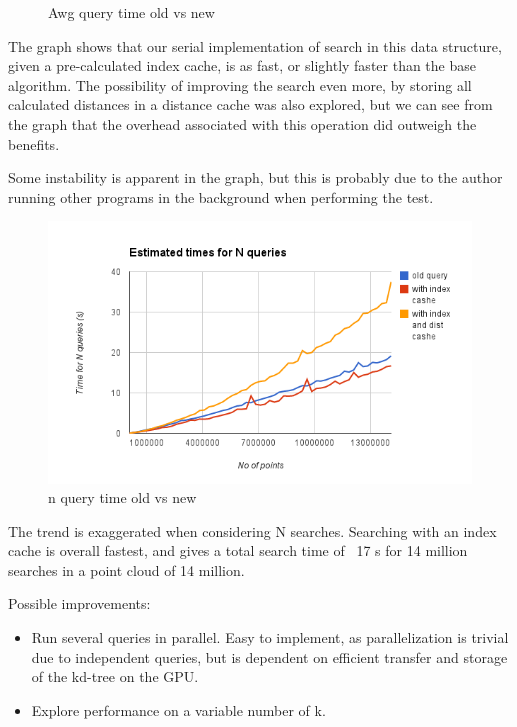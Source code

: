 \begin{enumerate}
\begin{enumerate}
\begin{figure}[ht!]
\caption{Awg query time old vs new}
\label{fig:awg_query_time_old_vs_new}
\end{figure}

The graph shows that our serial implementation of search in this data structure, given a pre-calculated index cache, is as fast, or slightly faster than the base algorithm. The possibility of improving the search even more, by storing all calculated distances in a distance cache was also explored, but we can see from the graph that the overhead associated with this operation did outweigh the benefits.

Some instability is apparent in the graph, but this is probably due to the author running other programs in the background when performing the test.

\begin{figure}[ht!]
\centering
\includegraphics[width=120mm]{gfx/n-query-time-old-vs-new.png}

\caption{n query time old vs new}
\label{fig:n_query_time_old_vs_new}
\end{figure}

The trend is exaggerated when considering N searches. Searching with an index cache is overall fastest, and gives a total search time of ~17 s for 14 million searches in a point cloud of 14 million.


Possible improvements:
\begin{itemize}
    \item Run several queries in parallel. Easy to implement, as parallelization is trivial due to independent queries, but is dependent on efficient transfer and storage of the kd-tree on the GPU.
    \item Explore performance on a variable number of k.
\end{itemize}


\end{enumerate}
\end{enumerate}
